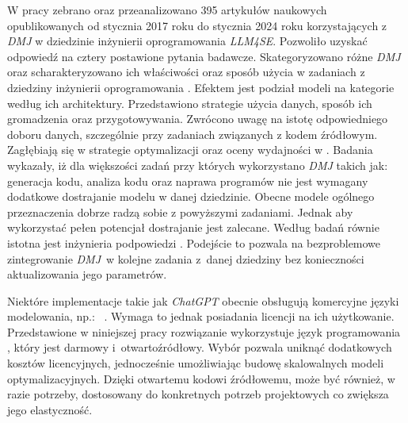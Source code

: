 W pracy \cite{10.1145/3695988} zebrano oraz przeanalizowano 395 artykułów naukowych opublikowanych od stycznia 2017 roku do stycznia 2024 roku korzystających z \textit{DMJ} w dziedzinie inżynierii oprogramowania \textit{LLM4SE}. Pozwoliło uzyskać odpowiedź na cztery postawione pytania badawcze. Skategoryzowano różne \textit{DMJ} oraz scharakteryzowano ich właściwości oraz sposób użycia w zadaniach z dziedziny inżynierii oprogramowania . Efektem jest podział modeli na kategorie według ich architektury. Przedstawiono strategie użycia danych, sposób ich gromadzenia oraz przygotowywania. Zwrócono uwagę na istotę odpowiedniego doboru danych, szczególnie przy zadaniach związanych z kodem źródłowym. Zagłębiają się w strategie optymalizacji oraz oceny wydajności  w . Badania wykazały, iż dla większości zadań przy których wykorzystano \textit{DMJ} takich jak: generacja kodu, analiza kodu oraz naprawa programów nie jest wymagany dodatkowe dostrajanie modelu  w danej dziedzinie. Obecne modele  ogólnego przeznaczenia dobrze radzą sobie z powyższymi zadaniami. Jednak aby wykorzystać pełen potencjał  dostrajanie jest zalecane. Według badań równie istotna jest inżynieria podpowiedzi . Podejście to pozwala na bezproblemowe zintegrowanie \textit{DMJ}~w kolejne zadania z~danej dziedziny bez konieczności aktualizowania jego parametrów.

Niektóre implementacje  takie jak \textit{ChatGPT} obecnie obsługują komercyjne języki modelowania, np.:~ \cite{ampl_chatgpt_guide}. Wymaga to jednak posiadania licencji na ich użytkowanie. 
Przedstawione w niniejszej pracy rozwiązanie wykorzystuje język programowania , który jest darmowy i~otwartoźródłowy. Wybór  pozwala uniknąć dodatkowych kosztów licencyjnych, jednocześnie umożliwiając budowę skalowalnych modeli optymalizacyjnych. Dzięki otwartemu kodowi źródłowemu,  może być również, w razie potrzeby, dostosowany do konkretnych potrzeb projektowych co zwiększa jego elastyczność.
